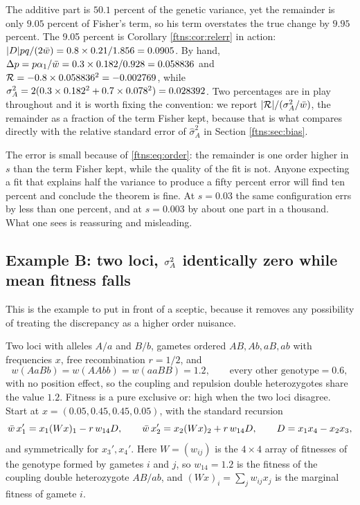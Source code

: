 The additive part is $50.1$ percent of the genetic variance, yet the remainder is only $9.05$
percent of Fisher's term, so his term overstates the true change by $9.95$ percent. The
9.05 percent is Corollary \ref{ftns:cor:relerr} in action: $|D|pq/(2\bar{w})=0.8\times0.21/1.856=0.0905$.
By hand, $\Delta p=p\alpha_1/\bar{w}=0.3\times0.182/0.928=0.058836$ and
$\mathcal{R}=-0.8\times0.058836^2=-0.002769$, while $\sigma^{2}_{A}=2(0.3\times0.182^2+0.7\times0.078^2)=0.028392$. Two percentages
are in play throughout and it is worth fixing the convention: we report
$|\mathcal{R}|/(\sigma^{2}_{A}/\bar{w})$, the remainder as a fraction of the term Fisher kept, because that is what
compares directly with the relative standard error of $\hat\sigma^2_A$ in Section \ref{ftns:sec:bias}.

The error is small because of \eqref{ftns:eq:order}: the remainder is one order higher in $s$ than the
term Fisher kept, while the quality of the fit is not. Anyone expecting a fit that explains half the
variance to produce a fifty percent error will find ten percent and conclude the theorem is fine.
At $s=0.03$ the same configuration errs by less than one percent, and at $s=0.003$ by about
one part in a thousand. What one sees is reassuring and
misleading.

\subsection{Example B: two loci, $\sigma^{2}_{A}$ identically zero while mean fitness falls}
\label{ftns:sec:exB}

This is the example to put in front of a sceptic, because it removes any possibility of treating
the discrepancy as a higher order nuisance.

Two loci with alleles $A/a$ and $B/b$, gametes ordered $AB,Ab,aB,ab$ with frequencies $x$, free
recombination $r=1/2$, and
\[
w(AaBb)=w(AAbb)=w(aaBB)=1.2,\qquad\text{every other genotype}=0.6 ,
\]
with no position effect, so the coupling and repulsion double heterozygotes share the value $1.2$.
Fitness is a pure exclusive or: high when the two loci disagree. Start at
$x=(0.05,0.45,0.45,0.05)$, with the standard recursion
\[
\bar{w}\,x_1' = x_1(Wx)_1 - r\,w_{14}D, \qquad
\bar{w}\,x_2' = x_2(Wx)_2 + r\,w_{14}D, \qquad
D = x_1x_4-x_2x_3 ,
\]
and symmetrically for $x_3',x_4'$. Here $W=(w_{ij})$ is the $4\times4$ array of fitnesses of the
genotype formed by gametes $i$ and $j$, so $w_{14}=1.2$ is the fitness of the coupling double
heterozygote $AB/ab$, and $(Wx)_i=\sum_jw_{ij}x_j$ is the marginal fitness of gamete $i$.

